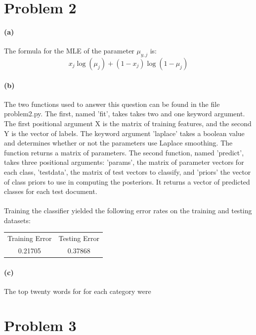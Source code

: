 \documentclass[12pt]{article}
\begin{document}
\section{Problem 2}
\paragraph{(a)} The formula for the MLE of the parameter $\mu_{y,j}$ is:
$$ x_j\log(\mu_j) + (1-x_j)\log(1-\mu_j) $$

\paragraph{(b)} The two functions used to answer this question can be found in the file problem2.py.  The first, named 'fit', takes takes two and one keyword argument.  The first positional argument X is the matrix of training features, and the second Y is the vector of labels.  The keyword argument 'laplace' takes a boolean value and determines whether or not the parameters use Laplace smoothing.  The function returns a matrix of parameters.  The second function, named 'predict', takes three positional arguments: 'params', the matrix of parameter vectors for each class, 'testdata', the matrix of test vectors to classify, and 'priors' the vector of class priors to use in computing the posteriors.  It returns a vector of predicted classes for each test document.

\paragraph{} Training the classifier yielded the following error rates on the training and testing datasets:

\begin{center}
\begin{tabular}{  c  c } 
Training Error & Testing Error \\
0.21705 & 0.37868 \\ 
\end{tabular}
\end{center}

\paragraph{(c)} The top twenty words for for each category were

\section{Problem 3}\label{previous work}
\end{document}
